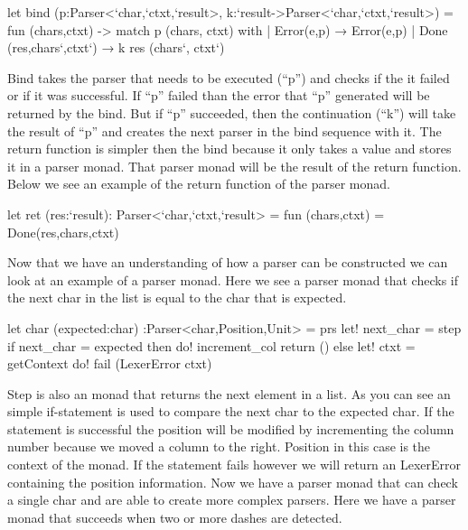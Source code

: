 \begin{code}
	let bind (p:Parser<`char,`ctxt,`result>, k:`result->Parser<`char,`ctxt,`result>) = 
		fun (chars,ctxt) ->
			match p (chars, ctxt) with
			| Error(e,p) → Error(e,p)
			| Done (res,chars`,ctxt`) →
				k res (chars`, ctxt`)
\end{code}

Bind takes the parser that needs to be executed (“p”) and checks if the it failed or if it was successful. If “p” failed  than the error that “p” generated will be returned by the bind. But if “p” succeeded, then the continuation (“k”) will take the result of  “p” and creates the next parser in the bind sequence with it.
\linebreak
The return function is simpler then the bind because it only takes a value and stores it in a parser monad. That parser monad will be the result of the return function. Below we see an example of the return function of the parser monad. 

\begin{code}
	let ret (res:`result): Parser<`char,`ctxt,`result> =
	fun (chars,ctxt) = Done(res,chars,ctxt)
\end{code}

Now that we have an understanding of how a parser can be constructed we can look at an example of a parser monad. Here we see a parser monad that checks if the next char in the list is equal to the char that is expected.


\begin{code}
	let char (expected:char) :Parser<char,Position,Unit> = 
	prs{ 
		let! next_char = step 
		if next_char = expected then 
			do! increment_col 
			return () 
		else 
			let! ctxt = getContext 
			do! fail (LexerError ctxt) 
	}
\end{code}

Step is also an monad that returns the next element in a list. As you can see an simple if-statement is used to compare the next char to the expected char. If the statement is successful the position will be modified by incrementing the column number because we moved a column to the right. 
\linebreak
Position in this case is the context of the monad. If the statement fails however we will return an LexerError containing the position information. Now we have a parser monad that can check a single char and are able to create more complex parsers. 
\linebreak
Here we have a parser monad that succeeds when two or more dashes are detected.

